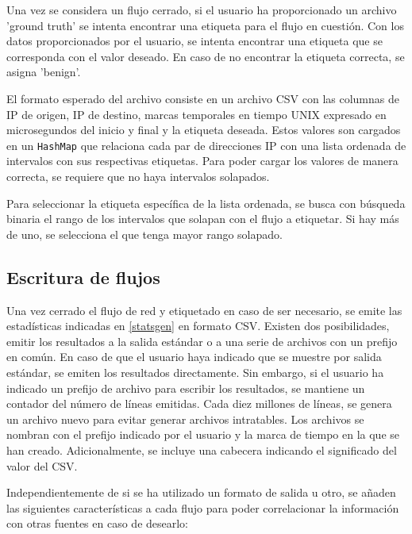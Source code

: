Una vez se considera un flujo cerrado, si el usuario ha proporcionado un archivo 'ground truth' se intenta encontrar una etiqueta para el flujo en cuestión. Con los datos proporcionados por el usuario, se intenta encontrar una etiqueta que se corresponda con el valor deseado. En caso de no encontrar la etiqueta correcta, se asigna 'benign'.

El formato esperado del archivo consiste en un archivo CSV con las columnas de IP de origen, IP de destino, marcas temporales en tiempo UNIX expresado en microsegundos del inicio y final y la etiqueta deseada. Estos valores son cargados en un \texttt{HashMap} que relaciona cada par de direcciones IP con una lista ordenada de intervalos con sus respectivas etiquetas. Para poder cargar los valores de manera correcta, se requiere que no haya intervalos solapados.

Para seleccionar la etiqueta específica de la lista ordenada, se busca con búsqueda binaria el rango de los intervalos que solapan con el flujo a etiquetar. Si hay más de uno, se selecciona el que tenga mayor rango solapado.

\subsection{Escritura de flujos} \label{flowwrite}

Una vez cerrado el flujo de red y etiquetado en caso de ser necesario, se emite las estadísticas indicadas en \ref{statsgen} en formato CSV. Existen dos posibilidades, emitir los resultados a la salida estándar o a una serie de archivos con un prefijo en común. En caso de que el usuario haya indicado que se muestre por salida estándar, se emiten los resultados directamente. Sin embargo, si el usuario ha indicado un prefijo de archivo para escribir los resultados, se mantiene un contador del número de líneas emitidas. Cada diez millones de líneas, se genera un archivo nuevo para evitar generar archivos intratables. Los archivos se nombran con el prefijo indicado por el usuario y la marca de tiempo en la que se han creado. Adicionalmente, se incluye una cabecera indicando el significado del valor del CSV.

Independientemente de si se ha utilizado un formato de salida u otro, se añaden las siguientes características a cada flujo para poder correlacionar la información con otras fuentes en caso de desearlo:

